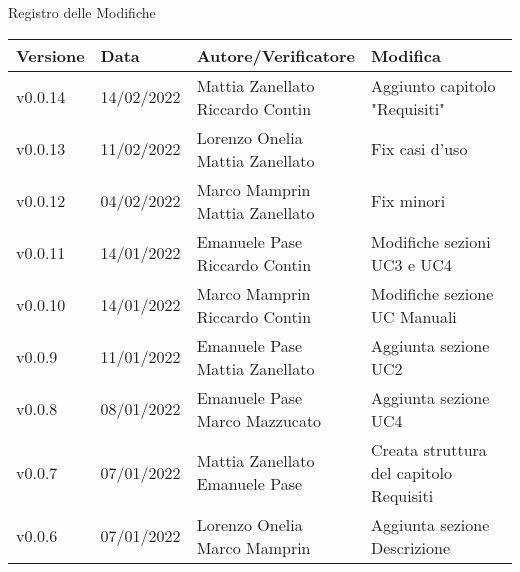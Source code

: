 \begin{center}
  \huge{Registro delle Modifiche}
\end{center}
\newcommand{\aCapo}[1]{%
  \begin{tabular}{@{}c@{}}\strut#1\strut\end{tabular}%
}
\begin{center}
  \begin{longtable}{|p{2cm}|p{2cm}|p{4cm}|p{5cm}|}
    \hline
    \textbf{Versione} & \textbf{Data} & \textbf{Autore/Verificatore}               & \textbf{Modifica}                               \\ \hline
    v0.0.14           & 14/02/2022    & \aCapo{Mattia Zanellato\\Riccardo Contin}  & Aggiunto capitolo "Requisiti"                   \\ \hline
    v0.0.13           & 11/02/2022    & \aCapo{Lorenzo Onelia\\Mattia Zanellato}   & Fix casi d'uso                                  \\ \hline
    v0.0.12           & 04/02/2022    & \aCapo{Marco Mamprin\\Mattia Zanellato}    & Fix minori                                      \\ \hline
    v0.0.11           & 14/01/2022    & \aCapo{Emanuele Pase\\Riccardo Contin}     & Modifiche sezioni UC3 e UC4                     \\ \hline
    v0.0.10           & 14/01/2022    & \aCapo{Marco Mamprin\\Riccardo Contin}     & Modifiche sezione UC Manuali                    \\ \hline
    v0.0.9            & 11/01/2022    & \aCapo{Emanuele Pase\\Mattia Zanellato}    & Aggiunta sezione UC2                            \\ \hline
    v0.0.8            & 08/01/2022    & \aCapo{Emanuele Pase\\Marco Mazzucato}     & Aggiunta sezione UC4                            \\ \hline
    v0.0.7            & 07/01/2022    & \aCapo{Mattia Zanellato\\Emanuele Pase}    & Creata struttura del capitolo Requisiti         \\ \hline
    v0.0.6            & 07/01/2022    & \aCapo{Lorenzo Onelia\\Marco Mamprin}      & Aggiunta sezione Descrizione                    \\ \hline

\end{longtable}
\end{center}
